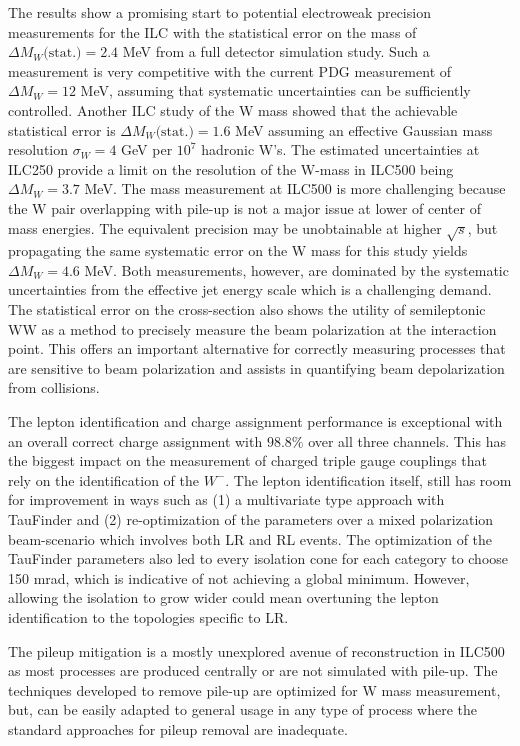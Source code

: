 The results show a promising start to potential electroweak precision measurements for the ILC with the statistical error on the mass of $\Delta M_W\text{(stat.)}= 2.4$ MeV from a full detector simulation study. Such a measurement is very competitive with the current PDG measurement of $\Delta M_W=12$ MeV, assuming that systematic uncertainties can be sufficiently controlled.  Another ILC study of the W mass showed that the achievable statistical error is $\Delta M_W\text{(stat.)} = 1.6$ MeV assuming an effective Gaussian mass resolution $\sigma_W= 4$ GeV per $10^7$ hadronic W's\cite{graham}. The estimated uncertainties at ILC250 provide a limit on the resolution of the W-mass in ILC500 being $\Delta M_W =3.7$ MeV. The mass measurement at ILC500 is more challenging because the W pair overlapping with pile-up is not a major issue at lower of center of mass energies. The equivalent precision may be unobtainable at higher $\sqrt{s}$, but propagating the same systematic error on the W mass for this study yields $\Delta M_W = 4.6$ MeV. Both measurements, however, are dominated by the systematic uncertainties from the effective jet energy scale which is a challenging demand.  The statistical error on the cross-section also shows the utility of semileptonic WW as a method to precisely measure the beam polarization at the interaction point. This offers an important alternative for  correctly measuring processes that are sensitive to beam polarization and assists in quantifying beam depolarization from collisions.

The lepton identification and charge assignment performance is exceptional with an overall correct charge assignment with $98.8\%$ over all three channels. This has the biggest impact on the measurement of charged triple gauge couplings that rely on the identification of the $W^-$. The lepton identification itself, still has room for improvement in ways such as (1) a multivariate type approach with TauFinder and (2) re-optimization of the parameters over a mixed polarization beam-scenario which involves both LR and RL events.  The optimization of the TauFinder parameters also led to every isolation cone for each category to choose 150 mrad, which is indicative of not achieving a global minimum. However, allowing the isolation to grow wider could mean overtuning the lepton identification to the topologies specific to LR. 

The pileup mitigation is a mostly unexplored avenue of reconstruction in ILC500 as most processes are produced centrally or are not simulated with pile-up. The techniques developed to remove pile-up are optimized for W mass measurement, but, can be easily adapted to general usage in any type of process where the standard approaches for pileup removal are inadequate. 

